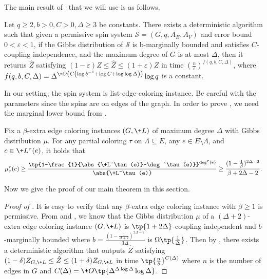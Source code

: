 The main result of~\cite{CFGZZ24} that we will use is as follows.
\begin{theorem}\label{thm:ci-FPTAS}
    Let $q \geq 2, b>0, C>0, \Delta \geq 3$ be constants. There exists a deterministic algorithm such that given a permissive spin system $\mathcal{S}=\left(G, q, A_E, A_V\right)$ and error bound $0<\varepsilon<1$, if the Gibbs distribution of $\mathcal{S}$ is b-marginally bounded and satisfies $C$-coupling independence, and the maximum degree of $G$ is at most $\Delta$, then it returns $\hat{Z}$ satisfying $(1-\varepsilon) Z \leq \hat{Z} \leq(1+\varepsilon) Z$ in time $\left(\frac{n}{\varepsilon}\right)^{f(q, b, C, \Delta)}$, where $f(q, b, C, \Delta)=\Delta^{\+O\left(C\left(\log b^{-1}+\log C+\log \log \Delta\right)\right)} \log q$ is a constant.
\end{theorem}
In our setting, the spin system is list-edge-coloring instance. Be careful with the parameters since the spins are on edges of the graph. In order to prove , we need the marginal lower bound from \cite{GKM15}.
\begin{lemma} \label{lem:marginal-bound-gkm}
Fix a $\beta$-extra edge coloring instances $(G,\+L)$ of maximum degree $\Delta$ with Gibbs distribution $\mu$. For any partial coloring $\tau$ on $\Lambda \subseteq E$, any $e \in E\setminus \Lambda$, and $c \in \+L^\tau(e)$, it holds that
	\[
		\mu^{\tau}_e(c) \geq \frac{\tp{1-\frac{1}{\abs{\+L^\tau(e)}-\deg^\tau(e)}}^{\deg^\tau(e)}}{\abs{\+L^\tau(e)}}\ge \frac{(1-\frac{1}{\beta})^{2\Delta-2}}{\beta+2\Delta-2} .
	\]
 \end{lemma}
Now we give the proof of our main theorem in this section.
\begin{proof}[Proof of ]
It is easy to verify that any $\beta$-extra edge coloring instance with $\beta \geq 1$ is permissive. From  and , we know that the Gibbs distribution $\mu$ of a $(\Delta + 2)$-extra edge coloring instance $(G,\+L)$ is $\tp{1+ 2\Delta}$-coupling independent and $b$-marginally bounded where $b=\frac{(1-\frac{1}{\Delta + 2})^{2\Delta-2}}{3\Delta}$ is $\Omega\tp{\frac{1}{\Delta}}$. Then by , there exists a deterministic algorithm that outputs $\hat{Z}$ satisfying $(1-\delta)Z_{G,\+L}\leq \hat{Z}\leq (1+\delta)Z_{G,\+L}$ in time $\tp{\frac{n}{\delta}}^{C(\Delta)}$ where $n$ is the number of edges in $G$ and $C(\Delta)=\+O\tp{\Delta^{\Delta\log \Delta}\log \Delta}$.
\end{proof}

